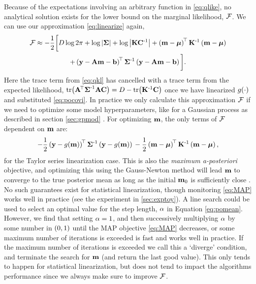\documentclass{article} %
\begin{document}
Because of the expectations involving an arbitrary function in
\eqref{eq:qlike}, no analytical solution exists for the lower bound on the
marginal likelihood, $\mathcal{F}$. We can use our approximation
\eqref{eq:linearize} again,
\begin{multline}
    \mathcal{F} \approx - \frac{1}{2} \bigg[
        D\log{2\pi} + \log\left|{\boldsymbol{\Sigma}}\right| + \log\left|{\mathbf{K}\mathbf{C}^{\text{-}1}}\right|
    + \left({\mathbf{m} - \boldsymbol{\mu}}\right)^{\!\top}\mathbf{K}^{\text{-}1}
        \left({\mathbf{m} - \boldsymbol{\mu}}\right) \\
    + \left({\mathbf{y} - \mathbf{A}\mathbf{m} - \mathbf{b}}\right)^{\!\top}\boldsymbol{\Sigma}^{\text{-}1}
        \left({\mathbf{y} - \mathbf{A}\mathbf{m} - \mathbf{b}}\right)
        \bigg].
    \label{eq:approxfengy}
\end{multline}
Here the trace term from \eqref{eq:qkl} has cancelled with a trace term from
the expected likelihood, $\text{tr}\!\left({\mathbf{A}^{\!\top}\boldsymbol{\Sigma}^{\text{-}1}\mathbf{A}\mathbf{C}}\right) = D -
\text{tr}\!\left({\mathbf{K}^{\text{-}1}\mathbf{C}}\right)$ once we have linearized $g\!\left({{\cdot}}\right)$ and
substituted \eqref{eq:pocovi}. In practice we only calculate this approximation
$\mathcal{F}$ if we need to optimize some model hyperparameters, like for a Gaussian
process as described in section \ref{sec:gpmod} . For optimizing $\mathbf{m}$, the
only  terms  of $\mathcal{F}$ dependent on $\mathbf{m}$ are:
\begin{equation}
    -\frac{1}{2} \left({\mathbf{y} - g\!\left({{\mathbf{m}}}\right)}\right)^{\!\top}
            \boldsymbol{\Sigma}^{\text{-}1}
            \left({\mathbf{y} - g\!\left({{\mathbf{m}}}\right)}\right) \\
    -\frac{1}{2}
        \left({\mathbf{m} - \boldsymbol{\mu}}\right)^{\!\top}
        \mathbf{K}^{\text{-}1}
        \left({\mathbf{m} - \boldsymbol{\mu}}\right),
    \label{eq:MAP}
\end{equation}
for the Taylor series linearization case. This is also the \emph{maximum
    a-posteriori} objective, and optimizing this using the Gauss-Newton method
will lead $\mathbf{m}$ to converge to the true posterior mean as long as the
initial $\mathbf{m}_0$ is sufficiently close \cite{Nocedal2006}. No such
guarantees exist for statistical linearization, though monitoring
\eqref{eq:MAP} works well in practice (see the experiment in
\autoref{sec:exptoy}). A line search could be used to select an optimal value
for the step length, $\alpha$ in Equation \eqref{eq:pomean}. However, we find
that setting $\alpha=1$, and then successively multiplying $\alpha$ by some
number in $\left({0, 1}\right)$ until the MAP objective \eqref{eq:MAP} decreases, or
some maximum number of iterations is exceeded is fast and works well in
practice. If the maximum number of iterations is exceeded we call this a
`diverge' condition, and terminate the search for $\mathbf{m}$ (and return the
last good value). This only tends to happen for statistical linearization, but
does not tend to impact the algorithms performance since we always make sure to
improve $\mathcal{F}$.
\end{document}
